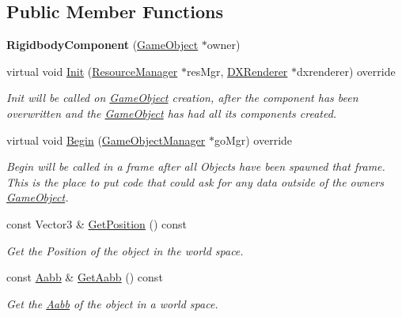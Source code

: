 \subsection*{Public Member Functions}
\begin{DoxyCompactItemize}
\item 
\mbox{\label{classRigidbodyComponent_ac10d3006d0d2324280f339f8adf3c5bc}} 
{\bfseries Rigidbody\+Component} (\hyperlink{classGameObject}{Game\+Object} $\ast$owner)
\item 
virtual void \hyperlink{classRigidbodyComponent_a3fe46e628d20481031089e0e3e6bc6ee}{Init} (\hyperlink{classResourceManager}{Resource\+Manager} $\ast$res\+Mgr, \hyperlink{classDXRenderer}{D\+X\+Renderer} $\ast$dxrenderer) override
\begin{DoxyCompactList}\small\item\em Init will be called on \hyperlink{classGameObject}{Game\+Object} creation, after the component has been overwritten and the \hyperlink{classGameObject}{Game\+Object} has had all its components created. \end{DoxyCompactList}\item 
virtual void \hyperlink{classRigidbodyComponent_af18ec4b42ca0c975e79f228fb515f2ac}{Begin} (\hyperlink{classGameObjectManager}{Game\+Object\+Manager} $\ast$go\+Mgr) override
\begin{DoxyCompactList}\small\item\em Begin will be called in a frame after all Objects have been spawned that frame. This is the place to put code that could ask for any data outside of the owner\textquotesingle{}s \hyperlink{classGameObject}{Game\+Object}. \end{DoxyCompactList}\item 
const Vector3 \& \hyperlink{classRigidbodyComponent_a6e0c112dd206b2f4cfe90941aeab110f}{Get\+Position} () const
\begin{DoxyCompactList}\small\item\em Get the Position of the object in the world space. \end{DoxyCompactList}\item 
const \hyperlink{classAabb}{Aabb} \& \hyperlink{classRigidbodyComponent_a383ec958d3a98df5b7870fb582834b14}{Get\+Aabb} () const
\begin{DoxyCompactList}\small\item\em Get the \hyperlink{classAabb}{Aabb} of the object in a world space. \end{DoxyCompactList}\item 

\end{DoxyCompactItemize}
